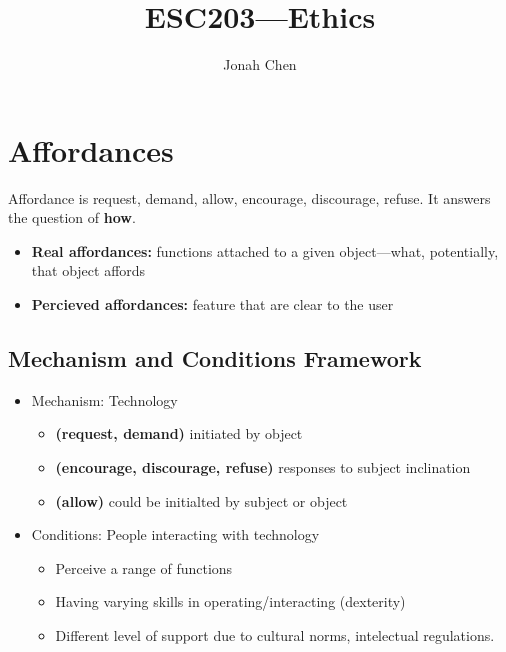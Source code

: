 \documentclass[a4paper]{article}
\title{ESC203---Ethics}
\author{Jonah Chen}
\numberwithin{equation}{section}
\begin{document}
\maketitle
\tableofcontents

\section{Affordances}

Affordance is request, demand, allow, encourage, discourage, refuse. It answers the question of \textbf{how}.

\begin{itemize}
    \item \textbf{Real affordances:} functions attached to a given object---what, potentially, that object affords
    \item \textbf{Percieved affordances:} feature that are clear to the user
\end{itemize}

\subsection{Mechanism and Conditions Framework}
\begin{itemize}
    \item Mechanism: Technology
    \begin{itemize}
        \item \textbf{(request, demand)} initiated by object
        \item \textbf{(encourage, discourage, refuse)} responses to subject inclination
        \item \textbf{(allow)} could be initialted by subject or object
    \end{itemize} 
    \item Conditions: People interacting with technology
    \begin{itemize}
        \item Perceive a range of functions
        \item Having varying skills in operating/interacting (dexterity)
        \item Different level of support due to cultural norms, intelectual regulations.
    \end{itemize}
\end{itemize}
\end{document}
